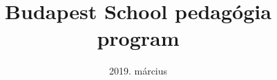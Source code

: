 \documentclass[magyar,12pt,a4paper,oneside,draft]{report}
\begin{document}
\title{Budapest School pedagógia program}
\author{}
\date{2019. m\'arcius}
\maketitle

\tableofcontents
\newpage



{}
\label{sec:bibliographyk}

\end{document}
